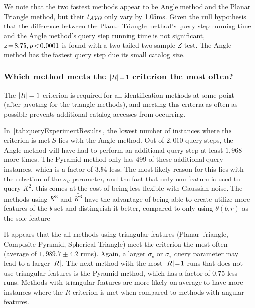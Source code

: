 \documentclass[conference]{IEEEtran}
\begin{document}
    We note that the two fastest methods appear to be Angle method and the Planar Triangle method, but their $t_{\mathit{AVG}}$ only
    vary by 1.05ms.
    Given the null hypothesis that the difference between the Planar Triangle method's query step running time and the
    Angle method's query step running time is not significant, $z \!=\! 8.75, p\!<\!0.0001$ is found with a two-tailed two
    sample $Z$ test.
    The Angle method has the fastest query step due its small catalog size.

    \subsubsection{Which method meets the $\left| R \right| \!=\! 1$ criterion the most often?}
    The $\left| R \right| = 1$ criterion is required for all identification methods at some point (after pivoting for the triangle
    methods), and meeting this criteria as often as possible prevents additional catalog accesses from occurring.

    In~\autoref{tab:queryExperimentResults}, the lowest number of instances where the criterion is met $S$ lies with the
    Angle method.
    Out of $2{,}000$ query steps, the Angle method will have had to perform an additional query step at least
    $1{,}968$ more times.
    The Pyramid method only has 499 of these additional query instances, which is a factor of 3.94 less.
    The most likely reason for this lies with the selection of the $\sigma_\theta$ parameter, and the fact that only one
    feature is used to query $K^2$.
    this comes at the cost of being less flexible with Gaussian noise.
    The methods using $K^3$ and $\bar{K^3}$ have the advantage of being able to create utilize more features of the $b$ set
    and distinguish it better, compared to only using $\theta(b, r)$ as the sole feature.

    It appears that the all methods using triangular features (Planar Triangle, Composite Pyramid, Spherical Triangle)
    meet the criterion the most often (average of $1{,}989.7 \pm 4.2$ runs).
    Again, a larger $\sigma_a$ or $\sigma_\tau$ query parameter may lead to a larger $\left| R \right|$.
    The next method with the most $\left| R \right| \!=\! 1$ runs that does not use triangular features is the Pyramid method,
    which has a factor of 0.75 less runs.
    Methods with triangular features are more likely on average to have more instances where the $R$ criterion is met
    when compared to methods with angular features.
\end{document}
